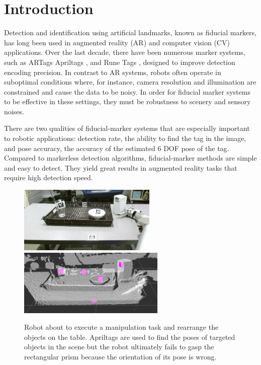 \section{Introduction}
\label{sec:intro}

Detection and identification using artificial landmarks, known as fiducial markers, has long been used in augmented reality (AR) and computer vision (CV) applications. Over the last decade, there have been numerous marker systems, such as ARTags \citep{fiala2004artag} Apriltags \citep{olson2011apriltag}, and Rune Tags \citep{bergamasco2011rune}, designed to improve detection encoding precision. In contrast to AR systems, robots often operate in suboptimal conditions where, for instance, camera resolution and illumination are constrained and cause the data to be noisy. In order for fiducial marker systems to be effective in these settings, they must be robustness to scenery and sensory noises.

	There are two qualities of fiducial-marker systems that are especially important to robotic applications: detection rate, the ability to find the tag in the image, and pose accuracy, the accuracy of the estimated 6 DOF pose of the tag. Compared to markerless detection algorithms, fiducial-marker methods are simple and easy to detect. They yield great results in augmented reality tasks that require high detection speed.

\begin{figure}
\includegraphics[width=\columnwidth, height=120px]{figs/table_clearing_rgb_small} \\
\includegraphics[width=\columnwidth, height=120px]{figs/table_clearing_depth}
\caption{Robot about to execute a manipulation task and rearrange the objects on the table. Apriltags are used to find the poses of targeted objects in the scene but the robot ultimately fails to gasp the rectangular prism because the orientation of its pose is wrong.}
\label{fig:table_clearing}
\end{figure}

